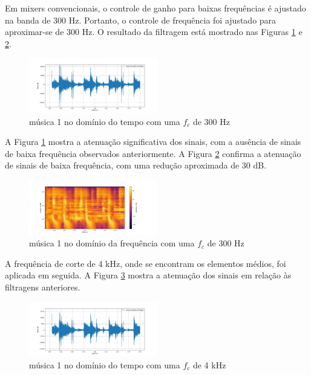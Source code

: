 Em mixers convencionais, o controle de ganho para baixas frequências é ajustado na banda de 300 Hz. Portanto, o controle de frequência foi ajustado para aproximar-se de 300 Hz. O resultado da filtragem está mostrado nas Figuras \ref{fig28} e \ref{fig29}.

\begin{figure}[h]
	\centering
    \includegraphics[width=0.5\textwidth]{figuras/fig28.png}
	\caption{música 1 no domínio do tempo com uma $f_c$ de 300 Hz}
	\label{fig28}
\end{figure}

A Figura \ref{fig28} mostra a atenuação significativa dos sinais, com a ausência de sinais de baixa frequência observados anteriormente. A Figura \ref{fig29} confirma a atenuação de sinais de baixa frequência, com uma redução aproximada de 30 dB.

\begin{figure}[h]
	\centering
    \includegraphics[width=0.5\textwidth]{figuras/fig29.png}
	\caption{música 1 no domínio da frequência com uma $f_c$ de 300 Hz}
	\label{fig29}
\end{figure}

A frequência de corte de 4 kHz, onde se encontram os elementos médios, foi aplicada em seguida. A Figura \ref{fig26} mostra a atenuação dos sinais em relação às filtragens anteriores.

\begin{figure}[h]
	\centering
    \includegraphics[width=0.5\textwidth]{figuras/fig26.png}
	\caption{música 1 no domínio do tempo com uma $f_c$ de 4 kHz}
	\label{fig26}
\end{figure}

